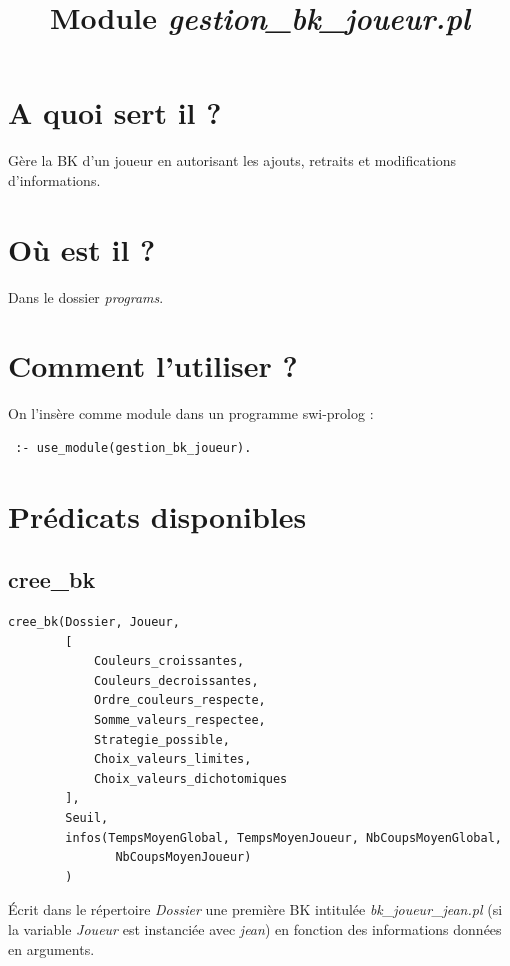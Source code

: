 \documentclass[a4paper,12pt]{article}
\begin{document}
\title{Module \emph{gestion\_bk\_joueur.pl}} 
\date{}
\maketitle

\section{A quoi sert il ?}
Gère la BK d’un joueur en autorisant les ajouts, retraits et modifications d’informations.

\section{Où est il ?}
	Dans le dossier \emph{programs}.
	
\section{Comment l’utiliser ?}
On l’insère comme module dans un programme swi-prolog :
	
\begin{Verbatim}
 :- use_module(gestion_bk_joueur).
\end{Verbatim}


\section{Prédicats disponibles}

\subsection{cree\_bk}

\begin{Verbatim}
cree_bk(Dossier, Joueur, 
		[
			Couleurs_croissantes,
			Couleurs_decroissantes,
			Ordre_couleurs_respecte,
			Somme_valeurs_respectee,
			Strategie_possible,
			Choix_valeurs_limites,
			Choix_valeurs_dichotomiques
		],
		Seuil,
		infos(TempsMoyenGlobal, TempsMoyenJoueur, NbCoupsMoyenGlobal, 
			   NbCoupsMoyenJoueur)
		)
\end{Verbatim}

Écrit dans le répertoire \emph{Dossier} une première BK intitulée \emph{bk\_joueur\_jean.pl} (si la variable \emph{Joueur} est instanciée avec \emph{jean}) en fonction 
des informations données en arguments.
\end{document}
